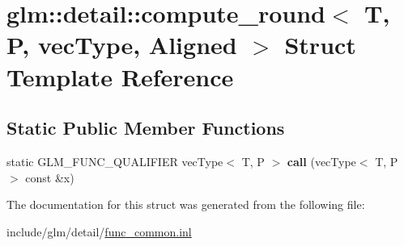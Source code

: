\hypertarget{structglm_1_1detail_1_1compute__round}{}\section{glm\+:\+:detail\+:\+:compute\+\_\+round$<$ T, P, vec\+Type, Aligned $>$ Struct Template Reference}
\label{structglm_1_1detail_1_1compute__round}
\subsection*{Static Public Member Functions}
\begin{DoxyCompactItemize}
\item 
\mbox{\label{structglm_1_1detail_1_1compute__round_a42119067083f483e40f6449e9d3d87ef}} 
static G\+L\+M\+\_\+\+F\+U\+N\+C\+\_\+\+Q\+U\+A\+L\+I\+F\+I\+ER vec\+Type$<$ T, P $>$ {\bfseries call} (vec\+Type$<$ T, P $>$ const \&x)
\end{DoxyCompactItemize}


The documentation for this struct was generated from the following file\+:\begin{DoxyCompactItemize}
\item 
include/glm/detail/\hyperlink{func__common_8inl}{func\+\_\+common.\+inl}\end{DoxyCompactItemize}
